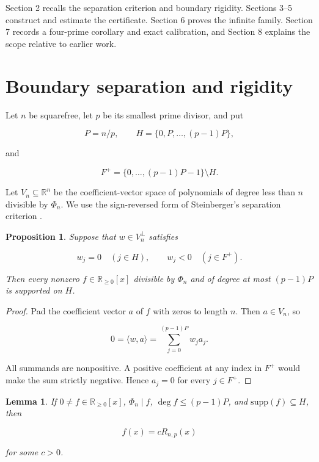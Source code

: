 \documentclass[11pt]{article}
\newtheorem{proposition}[theorem]{Proposition}
\newtheorem{lemma}[theorem]{Lemma}
\numberwithin{equation}{section}
\begin{document}
Section 2 recalls the separation criterion and boundary rigidity. Sections
3--5 construct and estimate the certificate. Section 6 proves the infinite
family. Section 7 records a four-prime corollary and exact calibration, and
Section 8 explains the scope relative to earlier work.

\section{Boundary separation and rigidity}


Let \(n\) be squarefree, let \(p\) be its smallest prime divisor, and put

\nopagebreak[4]
\[
P=n/p,\qquad
H=\{0,P,\ldots,(p-1)P\},
\tag{2.1}
\]

and

\nopagebreak[4]
\[
F^+=\{0,\ldots,(p-1)P-1\}\setminus H.
\tag{2.2}
\]

Let \(V_n\subseteq\mathbb R^n\) be the coefficient-vector space of
polynomials of degree less than \(n\) divisible by \(\Phi_n\). We use the
sign-reversed form of Steinberger's separation criterion \cite[Lemma 1]{steinberger2012}.

\Needspace{0.28\textheight}
\begin{proposition}

Suppose that \(w\in V_n^\perp\) satisfies

\nopagebreak[4]
\[
w_j=0\quad(j\in H),
\qquad
w_j<0\quad(j\in F^+).
\tag{2.3}
\]

Then every nonzero \(f\in\mathbb R_{\geq0}[x]\) divisible by \(\Phi_n\) and
of degree at most \((p-1)P\) is supported on \(H\).

\end{proposition}

\begin{proof}

Pad the coefficient vector \(a\) of \(f\) with zeros to length \(n\).
Then \(a\in V_n\), so

\nopagebreak[4]
\[
0=\langle w,a\rangle
=\sum_{j=0}^{(p-1)P}w_ja_j.
\]

All summands are nonpositive. A positive coefficient at any index in \(F^+\)
would make the sum strictly negative. Hence \(a_j=0\) for every
\(j\in F^+\).
\end{proof}


\Needspace{0.28\textheight}
\begin{lemma}

If \(0\ne f\in\mathbb R_{\geq0}[x]\), \(\Phi_n\mid f\),
\(\deg f\leq(p-1)P\), and \(\mathrm{supp}(f)\subseteq H\), then

\nopagebreak[4]
\[
f(x)=cR_{n,p}(x)
\tag{2.4}
\]

for some \(c>0\).

\end{lemma}
\end{document}
